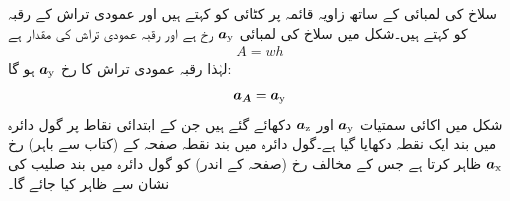 سلاخ  کی لمبائی کے ساتھ زاویہ قائمہ  پر  کٹائی کو  کہتے ہیں اور عمودی تراش کے رقبہ کو  کہتے ہیں۔شکل   میں  سلاخ کی لمبائی   ${\boldsymbol{a}}_{\textup{y}}$  رخ  ہے اور  رقبہ عمودی تراش  کی مقدار  ہے
\begin{align}
A=wh
\end{align}
لہٰذا رقبہ عمودی تراش کا رخ  ${\boldsymbol{a}}_{\textup{y}}$  ہو گا:
\begin{align}
{\ensuremath{{\boldsymbol{a_A}}}}={\boldsymbol{a}}_{\textup{y}}
\end{align}
شکل   میں  اکائی سمتیات  ${\boldsymbol{a}}_{\textup{y}}$  اور  ${\boldsymbol{a}}_{\textup{z}}$ دکھائے گئے ہیں جن کے ابتدائی نقاط پر گول دائرہ میں بند ایک نقطہ دکھایا گیا ہے۔گول دائرہ میں بند نقطہ صفحہ کے   (کتاب سے باہر)  رخ  ${\boldsymbol{a}}_{\textup{x}}$ ظاہر کرتا ہے جس کے مخالف رخ  (صفحہ کے   اندر)  کو گول دائرہ میں بند صلیب کی نشان سے ظاہر کیا جائے گا۔
%
